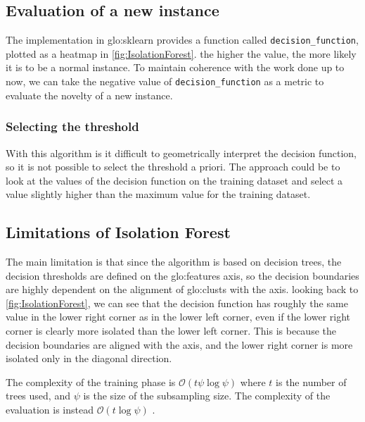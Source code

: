 \subsection{Evaluation of a new instance}
\label{sec:iforest_eval}
The implementation in \gls{glo:sklearn} provides a function called \texttt{decision\_function}, plotted as a heatmap in \autoref{fig:IsolationForest}. the higher the value, the more likely it is to be a normal instance.
To maintain coherence with the work done up to now, we can take the negative value of \texttt{decision\_function} as a metric to evaluate the novelty of a new instance.

\subsubsection{Selecting the threshold}
\label{sec:iforest_threshold}
With this algorithm is it difficult to geometrically interpret the decision function, so it is not possible to select the threshold a priori. The approach could be to look at the values of the decision function on the training dataset and select a value slightly higher than the maximum value for the training dataset.

\subsection{Limitations of Isolation Forest}
The main limitation is that since the algorithm is based on decision trees, the decision thresholds are defined on the \gls{glo:feature}s axis, so the decision boundaries are highly dependent on the alignment of \gls{glo:clust}s with the axis. looking back to \autoref{fig:IsolationForest}, we can see that the decision function has roughly the same value in the lower right corner as in the lower left corner, even if the lower right corner is clearly more isolated than the lower left corner. This is because the decision boundaries are aligned with the axis, and the lower right corner is more isolated only in the diagonal direction.

The complexity of the training phase is $\mathcal{O}(t\psi\log\psi)$ where $t$ is the number of trees used, and $\psi$ is the size of the subsampling size. The complexity of the evaluation is instead $\mathcal{O}(t\log\psi)$ \cite{iforest}.
